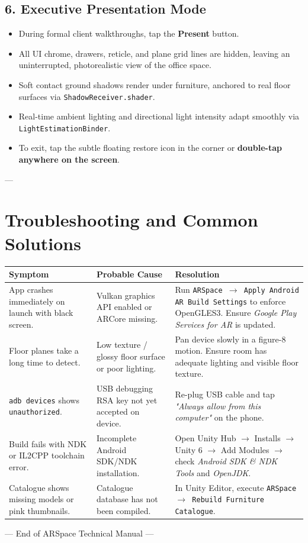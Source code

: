 \documentclass[11pt,a4paper]{article}
\begin{document}
\subsection{6. Executive Presentation Mode}
\begin{itemize}
    \item During formal client walkthroughs, tap the \textbf{Present} button.
    \item All UI chrome, drawers, reticle, and plane grid lines are hidden, leaving an uninterrupted, photorealistic view of the office space.
    \item Soft contact ground shadows render under furniture, anchored to real floor surfaces via \texttt{ShadowReceiver.shader}.
    \item Real-time ambient lighting and directional light intensity adapt smoothly via \texttt{LightEstimationBinder}.
    \item To exit, tap the subtle floating restore icon in the corner or \textbf{double-tap anywhere on the screen}.
\end{itemize}

---

\section{Troubleshooting and Common Solutions}

\begin{table}[h!]
\centering
\small
\begin{tabular}{p{4.5cm} p{4.5cm} p{5.5cm}}
\toprule
\textbf{Symptom} & \textbf{Probable Cause} & \textbf{Resolution} \\
\midrule
App crashes immediately on launch with black screen. & Vulkan graphics API enabled or ARCore missing. & Run \texttt{ARSpace $\rightarrow$ Apply Android AR Build Settings} to enforce OpenGLES3. Ensure \textit{Google Play Services for AR} is updated. \\
\addlinespace
Floor planes take a long time to detect. & Low texture / glossy floor surface or poor lighting. & Pan device slowly in a figure-8 motion. Ensure room has adequate lighting and visible floor texture. \\
\addlinespace
\texttt{adb devices} shows \texttt{unauthorized}. & USB debugging RSA key not yet accepted on device. & Re-plug USB cable and tap \textit{"Always allow from this computer"} on the phone. \\
\addlinespace
Build fails with NDK or IL2CPP toolchain error. & Incomplete Android SDK/NDK installation. & Open Unity Hub $\rightarrow$ Installs $\rightarrow$ Unity 6 $\rightarrow$ Add Modules $\rightarrow$ check \textit{Android SDK \& NDK Tools} and \textit{OpenJDK}. \\
\addlinespace
Catalogue shows missing models or pink thumbnails. & Catalogue database has not been compiled. & In Unity Editor, execute \texttt{ARSpace $\rightarrow$ Rebuild Furniture Catalogue}. \\
\bottomrule
\end{tabular}
\end{table}

\vfill
\begin{center}
\color{gray}\small --- End of ARSpace Technical Manual ---
\end{center}
\end{document}
